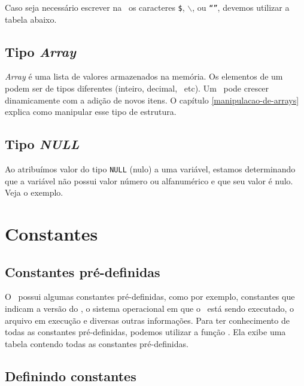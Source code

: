

Caso seja necessário escrever na \tipostring~os caracteres \texttt{\$}, 
\texttt{$\backslash$}, \texttt{\textquotesingle} ou \texttt{{``''}}, devemos utilizar a tabela abaixo. 



\subsection{Tipo \textit{Array}}
\label{tipo-array}

\textit{Array} é uma lista de valores armazenados na memória. Os elementos de um \tipoarray~
podem ser de tipos diferentes (inteiro, decimal, \tipostring~etc). Um \tipoarray~pode crescer
dinamicamente com a adição de novos itens. O capítulo \ref{manipulacao-de-arrays} explica como
manipular esse tipo de estrutura.

\subsection{Tipo \textit{NULL}}
\label{tipo-null}

Ao atribuímos valor do tipo \texttt{NULL} (nulo) a uma variável, estamos determinando
que a variável não possui valor número ou alfanumérico e que seu valor é nulo. Veja o exemplo.



\section{Constantes}
\label{constantes}

\subsection{Constantes pré-definidas}
\label{constantes-pre-definidas}

O \php~possui algumas constantes pré-definidas, como por exemplo, constantes que indicam a versão
do \php, o sistema operacional em que o \php~está sendo executado, o arquivo em execução
e diversas outras informações. Para ter conhecimento de todas as constantes pré-definidas,
podemos utilizar a função \funcaophpinfo. Ela exibe uma tabela contendo todas as constantes
pré-definidas.

\subsection{Definindo constantes}
\label{definindo-constantes}

